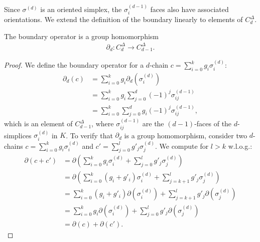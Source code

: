 Since \( \sigma^{(d)} \) is an oriented simplex, the \( \sigma^{(d-1)}_{i} \) faces also have associated orientations. We extend the definition of the boundary linearly to elements of \( C^{\Delta}_{d} \).

\begin{lemma}
	The boundary operator is a group homomorphism
	\begin{align}
		\partial_d: C^{\Delta}_{d} \to C^{\Delta}_{d-1}. 
	\end{align}
\end{lemma}

\begin{proof}
	We define the boundary operator for a \( d \)-chain \( c = \sum_{i=0}^{k} g_{i} \sigma_{i}^{(d)} \):
	\begin{align}
		\partial_d(c) & = \sum_{i=0}^{k} g_{i} \partial_d(\sigma_{i}^{(d)})                    \\
		            & = \sum_{i=0}^{k} g_{i} \sum_{j=0}^{d} (-1)^{j} \sigma_{ij}^{(d-1)}  \\
		            & = \sum_{i=0}^{k} \sum_{j=0}^{d} g_{i} (-1)^{j} \sigma_{ij}^{(d-1)}, 
	\end{align}
	which is an element of \( C^{\Delta}_{d-1} \), where \( \sigma_{ij}^{(d-1)} \) are the \( (d-1) \)-faces of the \( d \)-simplices \( \sigma_{i}^{(d)} \) in \( K \). To verify that \( \partial_d \) is a group homomorphism, consider two \( d \)-chains \( c = \sum_{i=0}^{k} g_{i} \sigma_{i}^{(d)} \) and \( c' = \sum_{j=0}^{l} g'_{j} \sigma_{j}^{(d)} \). We compute for $l > k$ w.l.o.g.:
	\begin{align}
		\partial(c + c') & = \partial\left( \sum_{i=0}^{k} g_{i} \sigma_{i}^{(d)} + \sum_{j=0}^{l} g'_{j} \sigma_{j}^{(d)} \right) \\
		                 & = \partial\left( \sum_{i=0}^{k} (g_{i} + g'_i) \sigma_{i}^{(d)} + \sum_{j=k+1}^{l} g'_{j} \sigma_{j}^{(d)} \right) \\
		                 & = \sum_{i=0}^{k} (g_{i}+g'_i) \partial(\sigma_{i}^{(d)}) + \sum_{j=k+1}^{l} g'_{j} \partial(\sigma_{j}^{(d)})    \\
		                 & = \sum_{i=0}^{k} g_{i} \partial(\sigma_{i}^{(d)}) + \sum_{j=0}^{l} g'_{j} \partial(\sigma_{j}^{(d)})    \\
		                 & = \partial(c) + \partial(c').                                                                           
	\end{align}
\end{proof}


